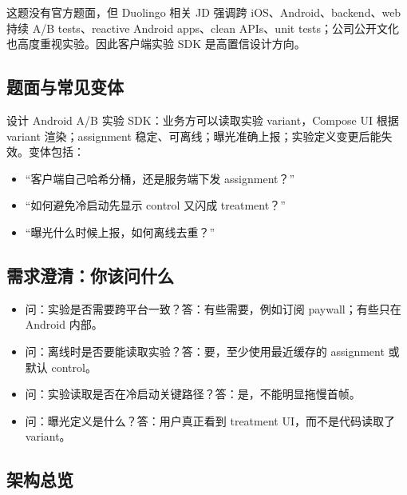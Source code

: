 
\srcinferred 这题没有官方题面，但 \srcofficial Duolingo 相关 JD 强调跨 iOS、Android、backend、web 持续 A/B tests、reactive Android apps、clean APIs、unit tests；\srcofficial 公司公开文化也高度重视实验。因此客户端实验 SDK 是高置信设计方向。

\subsection{题面与常见变体}

设计 Android A/B 实验 SDK：业务方可以读取实验 variant，Compose UI 根据 variant 渲染；assignment 稳定、可离线；曝光准确上报；实验定义变更后能失效。变体包括：

\begin{itemize}
  \item “客户端自己哈希分桶，还是服务端下发 assignment？”
  \item “如何避免冷启动先显示 control 又闪成 treatment？”
  \item “曝光什么时候上报，如何离线去重？”
\end{itemize}

\subsection{需求澄清：你该问什么}

\begin{itemize}
  \item 问：实验是否需要跨平台一致？答：有些需要，例如订阅 paywall；有些只在 Android 内部。
  \item 问：离线时是否要能读取实验？答：要，至少使用最近缓存的 assignment 或默认 control。
  \item 问：实验读取是否在冷启动关键路径？答：是，不能明显拖慢首帧。
  \item 问：曝光定义是什么？答：用户真正看到 treatment UI，而不是代码读取了 variant。
\end{itemize}

\subsection{架构总览}

